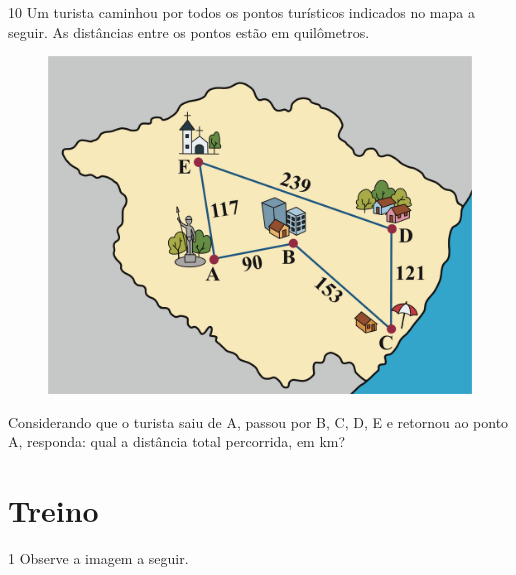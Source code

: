 
\pagebreak
\num{10} Um turista caminhou por todos os pontos turísticos indicados no mapa a seguir.
As distâncias entre os pontos estão em quilômetros.

\begin{figure}[htpb!]
\centering
\includegraphics[width=\textwidth]{./ilustras-mat/modulo_12-atividade_10.png}
\end{figure}


Considerando que o turista saiu de A, passou por B, C, D, E e retornou ao ponto A,
responda: qual a distância total percorrida, em km?


\pagebreak
\section*{Treino}

\num{1} Observe a imagem a seguir.

